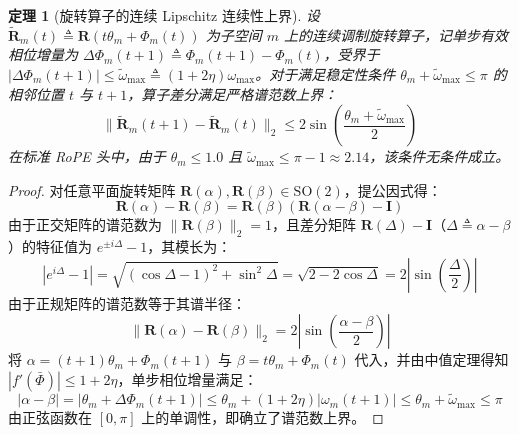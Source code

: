 \documentclass[11pt,a4paper]{article}
\newtheorem{theorem}{定理}
\theoremstyle{definition}
\begin{document}
\begin{theorem}[旋转算子的连续 Lipschitz 连续性上界]
\label{thm:lipschitz}
设 $\tilde{\mathbf{R}}_m(t) \triangleq \mathbf{R}(t\theta_m + \Phi_m(t))$ 为子空间 $m$ 上的连续调制旋转算子，记单步有效相位增量为 $\Delta\Phi_m(t+1) \triangleq \Phi_m(t+1) - \Phi_m(t)$，受界于 $|\Delta\Phi_m(t+1)| \le \tilde{\omega}_{\max} \triangleq (1 + 2\eta)\omega_{\max}$。对于满足稳定性条件 $\theta_m + \tilde{\omega}_{\max} \le \pi$ 的相邻位置 $t$ 与 $t+1$，算子差分满足严格谱范数上界：
\begin{equation}
\|\tilde{\mathbf{R}}_m(t+1) - \tilde{\mathbf{R}}_m(t)\|_2 \le 2\sin\left(\frac{\theta_m + \tilde{\omega}_{\max}}{2}\right)
\end{equation}
在标准 RoPE 头中，由于 $\theta_m \le 1.0$ 且 $\tilde{\omega}_{\max} \le \pi - 1 \approx 2.14$，该条件无条件成立。
\end{theorem}
\begin{proof}
对任意平面旋转矩阵 $\mathbf{R}(\alpha), \mathbf{R}(\beta) \in \mathrm{SO}(2)$，提公因式得：
\begin{equation}
\mathbf{R}(\alpha) - \mathbf{R}(\beta) = \mathbf{R}(\beta) \left( \mathbf{R}(\alpha - \beta) - \mathbf{I} \right)
\end{equation}
由于正交矩阵的谱范数为 $\|\mathbf{R}(\beta)\|_2 = 1$，且差分矩阵 $\mathbf{R}(\Delta) - \mathbf{I}$（$\Delta \triangleq \alpha - \beta$）的特征值为 $e^{\pm i \Delta} - 1$，其模长为：
\begin{equation}
|e^{i \Delta} - 1| = \sqrt{(\cos\Delta - 1)^2 + \sin^2\Delta} = \sqrt{2 - 2\cos\Delta} = 2\left|\sin\left(\frac{\Delta}{2}\right)\right|
\end{equation}
由于正规矩阵的谱范数等于其谱半径：
\begin{equation}
\|\mathbf{R}(\alpha) - \mathbf{R}(\beta)\|_2 = 2\left|\sin\left(\frac{\alpha - \beta}{2}\right)\right|
\end{equation}
将 $\alpha = (t+1)\theta_m + \Phi_m(t+1)$ 与 $\beta = t\theta_m + \Phi_m(t)$ 代入，并由中值定理得知 $|f'(\bar{\Phi})| \le 1 + 2\eta$，单步相位增量满足：
\begin{equation}
|\alpha - \beta| = |\theta_m + \Delta\Phi_m(t+1)| \le \theta_m + (1 + 2\eta)|\omega_m(t+1)| \le \theta_m + \tilde{\omega}_{\max} \le \pi
\end{equation}
由正弦函数在 $[0, \pi]$ 上的单调性，即确立了谱范数上界。
\end{proof}
\end{document}

